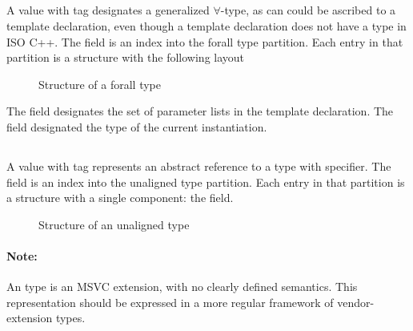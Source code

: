 \subsection{}
\label{sec:ifc:TypeSort:Forall}

A  value with tag  designates a generalized $\forall$-type,
as can could be ascribed to a template declaration, even though a template declaration does not have a type in ISO C++. 
The  field is an index into the forall type partition.
Each entry in that partition is a structure with the following layout
%
\begin{figure}[H]
	\centering
	\caption{Structure of a forall type}
	\label{fig:ifc-forall-type-structure}
\end{figure}
%
The  field designates the set of parameter lists in the template declaration.
The  field designated the type of the current instantiation.




\subsection{}
\label{sec:ifc:TypeSort:Unaligned}

A  value with tag  represents
an abstract reference to a type with  specifier.
The  field is an index into the unaligned type partition.
Each entry in that partition is a structure with a single component: the  field.
%
\begin{figure}[H]
	\centering
	\caption{Structure of an unaligned type}
	\label{fig:ifc-unaligned-type-structure}
\end{figure}
%


\paragraph{Note:} An  type is an MSVC extension, with no
clearly defined semantics.  This representation should be expressed in a more
regular framework of vendor-extension types.


